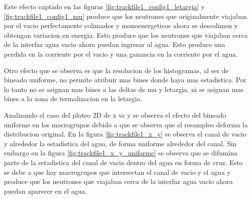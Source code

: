 Este efecto captado en las figuras \ref{fig:trackfile1_config1_letargia} y \ref{fig:trackfile1_config1_mu} produce que los neutrones que originalmente viajaban por el vacio perfectamente colimados y monoenergeticos ahora se descolimen y obtengan variacion en energia. Esto produce que los neutrones que viajaban cerca de la interfaz agua vacio ahora puedan ingresar al agua. Esto produce una perdida en la corriente por el vacio y una ganancia en la corriente por el agua. 

Otro efecto que se observa es que la resolucion de los histogramas, al ser de bineado uniforme, no permite atribuir mas bines donde haya mas estadistica. Por lo tanto no se asignan mas bines a las deltas de mu y letargia, ni se asignan mas bines a la zona de termalizacion en la letargia.



Analizando el caso del ploteo 2D de x vs y se observa el efecto del bineado uniforme en los macrogrupos debido a que se observa que el resampleo deforma la distribucion original. En la figura \ref{fig:trackfile1_x_y} se observa el canal de vacio y alrededor la estadistica del agua, de forma uniforme alrededor del canal. Sin embargo en la figura \ref{fig:trackfile1_x_y_uniforme} se observa que se difumina parte de la estadistica del canal de vacio dentro del agua en forma de cruz. Esto se debe a que hay macrogrupos que intersectan el canal de vacio y el agua y produce que los neutrones que viajaban cerca de la interfaz agua vacio ahora puedan aparecer en el agua.

